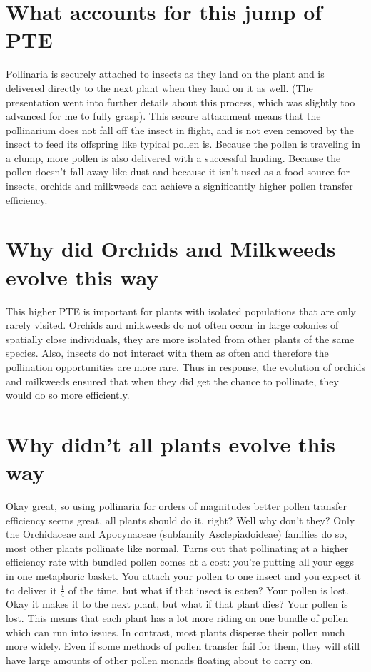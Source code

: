 \documentclass[12pt]{article}
\begin{document}
\section{What accounts for this jump of PTE}

Pollinaria is securely attached to insects as they land on the plant and is delivered directly to the next plant when they land on it as well. (The presentation went into further details about this process, which was slightly too advanced for me to fully grasp). This secure attachment means that the pollinarium does not fall off the insect in flight, and is not even removed by the insect to feed its offspring like typical pollen is. Because the pollen is traveling in a clump, more pollen is also delivered with a successful landing. Because the pollen doesn't fall away like dust and because it isn't used as a food source for insects, orchids and milkweeds can achieve a significantly higher pollen transfer efficiency. 

\section{Why did Orchids and Milkweeds evolve this way}

This higher PTE is important for plants with isolated populations that are only rarely visited. Orchids and milkweeds do not often occur in large colonies of spatially close individuals, they are more isolated from other plants of the same species. Also, insects do not interact with them as often and therefore the pollination opportunities are more rare. Thus in response, the evolution of orchids and milkweeds ensured that when they did get the chance to pollinate, they would do so more efficiently. 

\section{Why didn't all plants evolve this way}

Okay great, so using pollinaria for orders of magnitudes better pollen transfer efficiency seems great, all plants should do it, right? Well why don't they? Only the Orchidaceae and Apocynaceae (subfamily Asclepiadoideae) families do so, most other plants pollinate like normal. Turns out that pollinating at a higher efficiency rate with bundled pollen comes at a cost: you're putting all your eggs in one metaphoric basket. You attach your pollen to one insect and you expect it to deliver it $\frac{1}{4}$ of the time, but what if that insect is eaten? Your pollen is lost. Okay it makes it to the next plant, but what if that plant dies? Your pollen is lost. This means that each plant has a lot more riding on one bundle of pollen which can run into issues. In contrast, most plants disperse their pollen much more widely. Even if some methods of pollen transfer fail for them, they will still have large amounts of other pollen monads floating about to carry on. 
\end{document}
